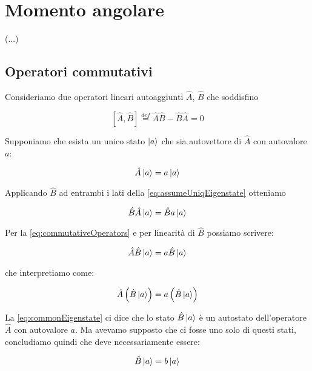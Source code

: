 \section{Momento angolare}

(...)

\subsection{Operatori commutativi}

Consideriamo due operatori lineari autoaggiunti $\hat{A}$, $\hat{B}$ che soddisfino

	\begin{equation} \label{eq:commutativeOperators}
		\left [ \hat{A}, \hat{B} \right ] \overset{def}{=} \hat{A}\hat{B} - \hat{B}\hat{A} = 0
	\end{equation}

Supponiamo che esista un unico stato $\ket{a}$ che sia autovettore di $\hat{A}$ con autovalore $a$:

	\begin{equation} \label{eq:assumeUniqEigenstate}
		\hat{A}\ket{a} = a \ket{a}
	\end{equation}

Applicando $\hat{B}$ ad entrambi i lati della \eqref{eq:assumeUniqEigenstate} otteniamo

	\begin{equation}
		\hat{B}\hat{A}\ket{a} = \hat{B}a\ket{a}
	\end{equation}

Per la \eqref{eq:commutativeOperators} e per linearit\`a di $\hat{B}$ possiamo scrivere:

	\begin{equation}
		\hat{A}\hat{B} \ket{a} = a \hat{B} \ket{a}
	\end{equation}

che interpretiamo come:

	\begin{equation} \label{eq:commonEigenstate}
		\hat{A} \left ( \hat{B} \ket{a} \right ) = a \left ( \hat{B} \ket{a} \right )
	\end{equation}

La \eqref{eq:commonEigenstate} ci dice che lo stato $\hat{B} \ket{a}$ \`e un autostato dell'operatore $\hat{A}$ con autovalore $a$. Ma avevamo supposto che ci fosse uno solo di questi stati, concludiamo quindi che deve necessariamente essere:

	\begin{equation} \label{eq:sharedEigenstate}
		\hat{B}\ket{a} = b \ket{a}
	\end{equation}

